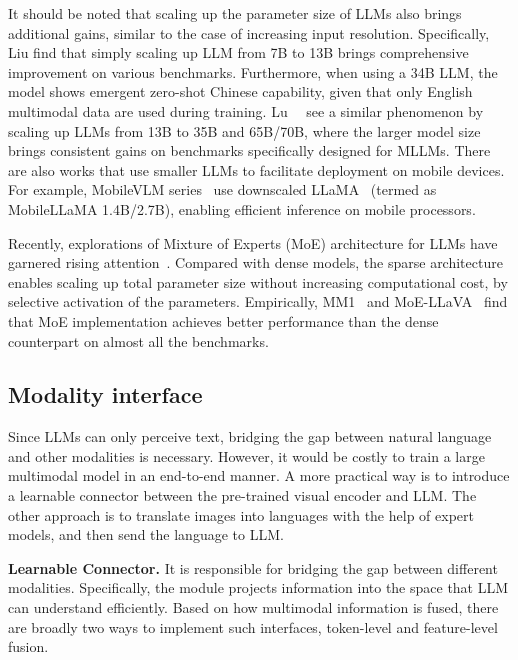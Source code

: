 It should be noted that scaling up the parameter size of LLMs also brings additional gains, similar to the case of increasing input resolution. Specifically, Liu \etal \cite{liu2023improved, liu2024llavanext} find that simply scaling up LLM from 7B to 13B brings comprehensive improvement on various benchmarks. Furthermore, when using a 34B LLM, the model shows emergent zero-shot Chinese capability, given that only English multimodal data are used during training. Lu~\etal~\cite{lu2023empirical} see a similar phenomenon by scaling up LLMs from 13B to 35B and 65B/70B, where the larger model size brings consistent gains on benchmarks specifically designed for MLLMs. 
There are also works that use smaller LLMs to facilitate deployment on mobile devices. For example, MobileVLM series~\cite{chu2023mobilevlm,chu2024mobilevlm} use downscaled LLaMA~\cite{llama} (termed as MobileLLaMA 1.4B/2.7B), enabling efficient inference on mobile processors.

Recently, explorations of Mixture of Experts (MoE) architecture for LLMs have garnered rising attention~\cite{shen2023mixture,jiang2024mixtral,fedus2022switch}. Compared with dense models, the sparse architecture enables scaling up total parameter size without increasing computational cost, by selective activation of the parameters. Empirically, MM1~\cite{mckinzie2024mm1} and MoE-LLaVA~\cite{lin2024moe} find that MoE implementation achieves better performance than the dense counterpart on almost all the benchmarks.



\subsection{Modality interface}
\label{sec:arch_modality_interface}
Since LLMs can only perceive text, bridging the gap between natural language and other modalities is necessary. 
However, it would be costly to train a large multimodal model in an end-to-end manner.  
A more practical way is to introduce a learnable connector between the pre-trained visual encoder and LLM. 
The other approach is to translate images into languages with the help of expert models, and then send the language to LLM.


\noindent \textbf{Learnable Connector.}
It is responsible for bridging the gap between different modalities.
Specifically, the module projects information into the space that LLM can understand efficiently. 
Based on how multimodal information is fused, there are broadly two ways to implement such interfaces, \ie token-level and feature-level fusion.

